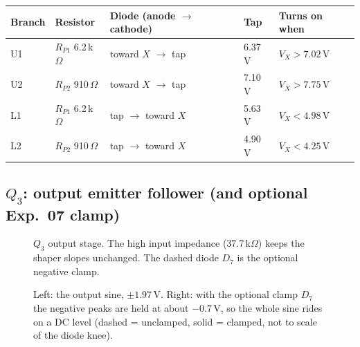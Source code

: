 \begin{center}
\small
\begin{tabularx}{\textwidth}{@{}llllX@{}}
\toprule
Branch & Resistor & Diode (anode $\rightarrow$ cathode) & Tap & Turns on when \\
\midrule
U1 & $R_{P1}$ 6.2\,k$\Omega$ & toward $X$ $\rightarrow$ tap & 6.37\,V & $V_X>7.02$\,V \\
U2 & $R_{P2}$ 910\,$\Omega$ & toward $X$ $\rightarrow$ tap & 7.10\,V & $V_X>7.75$\,V \\
L1 & $R_{P1}$ 6.2\,k$\Omega$ & tap $\rightarrow$ toward $X$ & 5.63\,V & $V_X<4.98$\,V \\
L2 & $R_{P2}$ 910\,$\Omega$ & tap $\rightarrow$ toward $X$ & 4.90\,V & $V_X<4.25$\,V \\
\bottomrule
\end{tabularx}
\end{center}

\subsection{$Q_3$: output emitter follower (and optional Exp.\ 07 clamp)}
\begin{figure}[H]
\centering
{}
\caption{$Q_3$ output stage. The high input impedance (37.7\,k$\Omega$) keeps the shaper slopes unchanged. The dashed diode $D_7$ is the optional negative clamp.}
\end{figure}

\begin{figure}[H]
\centering
{}
\caption{Left: the output sine, $\pm1.97$\,V. Right: with the optional clamp $D_7$ the negative peaks are held at about $-0.7$\,V, so the whole sine rides on a DC level (dashed = unclamped, solid = clamped, not to scale of the diode knee).}
\end{figure}

